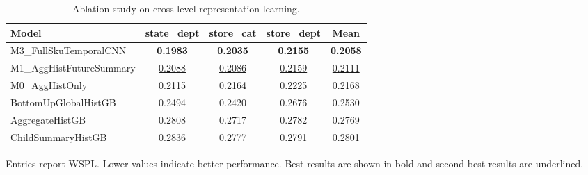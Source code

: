 \begin{table}[H]
\centering
\caption{Ablation study on cross-level representation learning.}
\label{tab:ablation}
\begin{threeparttable}
\begin{tabular}{lcccc}
\toprule
Model & state\_dept & store\_cat & store\_dept & Mean \\
\midrule
M3\_FullSkuTemporalCNN & \textbf{0.1983} & \textbf{0.2035} & \textbf{0.2155} & \textbf{0.2058} \\
M1\_AggHistFutureSummary & \underline{0.2088} & \underline{0.2086} & \underline{0.2159} & \underline{0.2111} \\
M0\_AggHistOnly & 0.2115 & 0.2164 & 0.2225 & 0.2168 \\
BottomUpGlobalHistGB & 0.2494 & 0.2420 & 0.2676 & 0.2530 \\
AggregateHistGB & 0.2808 & 0.2717 & 0.2782 & 0.2769 \\
ChildSummaryHistGB & 0.2836 & 0.2777 & 0.2791 & 0.2801 \\
\bottomrule
\end{tabular}
\begin{tablenotes}
\footnotesize \item Entries report WSPL. Lower values indicate better performance. Best results are shown in bold and second-best results are underlined.
\end{tablenotes}
\end{threeparttable}
\end{table}
